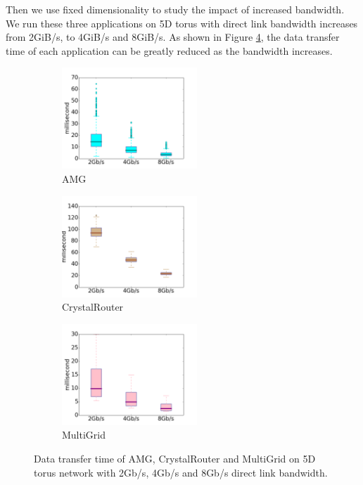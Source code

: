 \documentclass[conference]{IEEEtran}
\begin{document}
Then we use fixed dimensionality to study the impact of increased bandwidth. We run these three applications on 5D torus with direct link bandwidth increases from 2GiB/s, to 4GiB/s and 8GiB/s. As shown in Figure \ref{fig:bandwidth-study}, the data transfer time of each application can be greatly reduced as the bandwidth increases. 

\begin{figure}[t!]
    \centering
    \begin{subfigure}[t]{0.32\textwidth}
        \centering
        \includegraphics[height=1.5in]{figs/bandwidthstudy/amg_bw_box}
        \caption{AMG}
        \label{fig:bdwstudy-amg}
    \end{subfigure}%
    \hspace{1em}%
    \begin{subfigure}[t]{0.32\textwidth}
        \centering
        \includegraphics[height=1.5in]{figs/bandwidthstudy/cr_bw_box}
        \caption{CrystalRouter}
        \label{fig:bdwstudy-cr}
    \end{subfigure}%
    \begin{subfigure}[t]{0.32\textwidth}
        \centering
        \includegraphics[height=1.5in]{figs/bandwidthstudy/mg_bw_box}
        \caption{MultiGrid}
        \label{fig:bdwstudy-mg}
    \end{subfigure}%
   \caption{Data transfer time of AMG, CrystalRouter and MultiGrid on 5D torus network with 2Gb/s, 4Gb/s and 8Gb/s direct link bandwidth. }
   \label{fig:bandwidth-study}
\end{figure}
\end{document}
